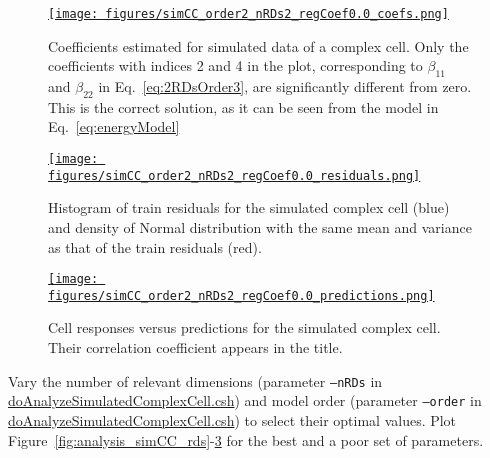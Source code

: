 \documentclass[12pt]{article}
\begin{document}
\begin{figure}[H]
    \begin{center}
        \href{https://www.gatsby.ucl.ac.uk/~rapela/neuroinformatics/2023/ws6/figures/simCC_order2_nRDs2_regCoef0.0_coefs.html}{\texttt{[image: figures/simCC\_order2\_nRDs2\_regCoef0.0\_coefs.png]}}

        \caption{Coefficients estimated for simulated data of a complex cell.
        Only the coefficients with indices 2 and 4 in the plot, corresponding to $\beta_{11}$ and
        $\beta_{22}$ in Eq.~\ref{eq:2RDsOrder3}, are significantly different from
        zero. This is the correct solution, as it can be seen from the model in
        Eq.~\ref{eq:energyModel}}

        \label{fig:analysis_simCC_coefs}
    \end{center}
\end{figure}

\begin{figure}[H]
    \begin{center}
        \href{https://www.gatsby.ucl.ac.uk/~rapela/neuroinformatics/2023/ws6/figures/simCC_order2_nRDs2_regCoef0.0_residuals.html}{\texttt{[image: figures/simCC\_order2\_nRDs2\_regCoef0.0\_residuals.png]}}

        \caption{Histogram of train residuals for the simulated complex cell (blue) and density of Normal distribution with the same mean and variance as that of the train residuals (red).}

        \label{fig:analysis_simCC_histResiduals}
    \end{center}
\end{figure}

\begin{figure}[H]
    \begin{center}
        \href{https://www.gatsby.ucl.ac.uk/~rapela/neuroinformatics/2023/ws6/figures/simCC_order2_nRDs2_regCoef0.0_predictions.html}{\texttt{[image: figures/simCC\_order2\_nRDs2\_regCoef0.0\_predictions.png]}}

        \caption{Cell responses versus predictions for the simulated complex cell. Their correlation coefficient appears in the title.}

        \label{fig:analysis_simCC_fittedRes}
    \end{center}
\end{figure}

Vary the number of relevant dimensions (parameter \texttt{--nRDs} in
\href{https://github.com/joacorapela/neuroinformatics24/blob/master/worksheets/06_linearRegression/code/scripts/doAnalyzeSimulatedComplexCell.csh}{doAnalyzeSimulatedComplexCell.csh})
and model order (parameter \texttt{--order} in
\href{https://github.com/joacorapela/neuroinformatics24/blob/master/worksheets/06_linearRegression/code/scripts/doAnalyzeSimulatedComplexCell.csh}{doAnalyzeSimulatedComplexCell.csh})
to select their optimal values. Plot
Figure~\ref{fig:analysis_simCC_rds}-\ref{fig:analysis_simCC_fittedRes} for the
best and a poor set of parameters.
\end{document}
